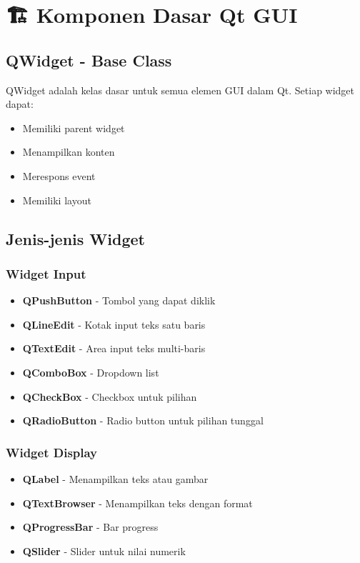 \section{🏗️ Komponen Dasar Qt GUI}

\subsection{QWidget - Base Class}

QWidget adalah kelas dasar untuk semua elemen GUI dalam Qt. Setiap widget dapat:
\begin{itemize}
\item Memiliki parent widget
\item Menampilkan konten
\item Merespons event
\item Memiliki layout
\end{itemize}

\subsection{Jenis-jenis Widget}

\subsubsection{Widget Input}
\begin{itemize}
\item \textbf{QPushButton} - Tombol yang dapat diklik
\item \textbf{QLineEdit} - Kotak input teks satu baris
\item \textbf{QTextEdit} - Area input teks multi-baris
\item \textbf{QComboBox} - Dropdown list
\item \textbf{QCheckBox} - Checkbox untuk pilihan
\item \textbf{QRadioButton} - Radio button untuk pilihan tunggal
\end{itemize}

\subsubsection{Widget Display}
\begin{itemize}
\item \textbf{QLabel} - Menampilkan teks atau gambar
\item \textbf{QTextBrowser} - Menampilkan teks dengan format
\item \textbf{QProgressBar} - Bar progress
\item \textbf{QSlider} - Slider untuk nilai numerik
\end{itemize}

